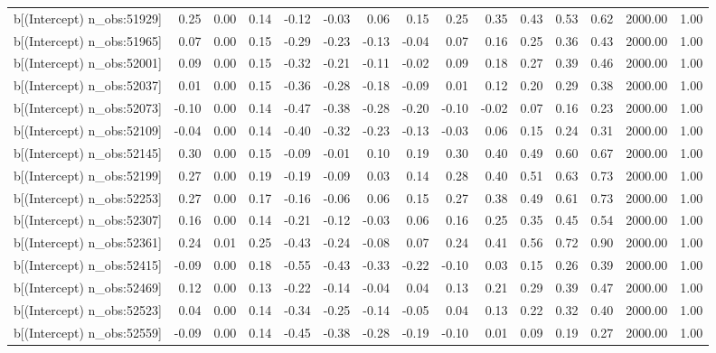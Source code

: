 \begin{table}[ht]
\begin{tabular}{rrrrrrrrrrrrrrr}
  b[(Intercept) n\_obs:51929] & 0.25 & 0.00 & 0.14 & -0.12 & -0.03 & 0.06 & 0.15 & 0.25 & 0.35 & 0.43 & 0.53 & 0.62 & 2000.00 & 1.00 \\ 
  b[(Intercept) n\_obs:51965] & 0.07 & 0.00 & 0.15 & -0.29 & -0.23 & -0.13 & -0.04 & 0.07 & 0.16 & 0.25 & 0.36 & 0.43 & 2000.00 & 1.00 \\ 
  b[(Intercept) n\_obs:52001] & 0.09 & 0.00 & 0.15 & -0.32 & -0.21 & -0.11 & -0.02 & 0.09 & 0.18 & 0.27 & 0.39 & 0.46 & 2000.00 & 1.00 \\ 
  b[(Intercept) n\_obs:52037] & 0.01 & 0.00 & 0.15 & -0.36 & -0.28 & -0.18 & -0.09 & 0.01 & 0.12 & 0.20 & 0.29 & 0.38 & 2000.00 & 1.00 \\ 
  b[(Intercept) n\_obs:52073] & -0.10 & 0.00 & 0.14 & -0.47 & -0.38 & -0.28 & -0.20 & -0.10 & -0.02 & 0.07 & 0.16 & 0.23 & 2000.00 & 1.00 \\ 
  b[(Intercept) n\_obs:52109] & -0.04 & 0.00 & 0.14 & -0.40 & -0.32 & -0.23 & -0.13 & -0.03 & 0.06 & 0.15 & 0.24 & 0.31 & 2000.00 & 1.00 \\ 
  b[(Intercept) n\_obs:52145] & 0.30 & 0.00 & 0.15 & -0.09 & -0.01 & 0.10 & 0.19 & 0.30 & 0.40 & 0.49 & 0.60 & 0.67 & 2000.00 & 1.00 \\ 
  b[(Intercept) n\_obs:52199] & 0.27 & 0.00 & 0.19 & -0.19 & -0.09 & 0.03 & 0.14 & 0.28 & 0.40 & 0.51 & 0.63 & 0.73 & 2000.00 & 1.00 \\ 
  b[(Intercept) n\_obs:52253] & 0.27 & 0.00 & 0.17 & -0.16 & -0.06 & 0.06 & 0.15 & 0.27 & 0.38 & 0.49 & 0.61 & 0.73 & 2000.00 & 1.00 \\ 
  b[(Intercept) n\_obs:52307] & 0.16 & 0.00 & 0.14 & -0.21 & -0.12 & -0.03 & 0.06 & 0.16 & 0.25 & 0.35 & 0.45 & 0.54 & 2000.00 & 1.00 \\ 
  b[(Intercept) n\_obs:52361] & 0.24 & 0.01 & 0.25 & -0.43 & -0.24 & -0.08 & 0.07 & 0.24 & 0.41 & 0.56 & 0.72 & 0.90 & 2000.00 & 1.00 \\ 
  b[(Intercept) n\_obs:52415] & -0.09 & 0.00 & 0.18 & -0.55 & -0.43 & -0.33 & -0.22 & -0.10 & 0.03 & 0.15 & 0.26 & 0.39 & 2000.00 & 1.00 \\ 
  b[(Intercept) n\_obs:52469] & 0.12 & 0.00 & 0.13 & -0.22 & -0.14 & -0.04 & 0.04 & 0.13 & 0.21 & 0.29 & 0.39 & 0.47 & 2000.00 & 1.00 \\ 
  b[(Intercept) n\_obs:52523] & 0.04 & 0.00 & 0.14 & -0.34 & -0.25 & -0.14 & -0.05 & 0.04 & 0.13 & 0.22 & 0.32 & 0.40 & 2000.00 & 1.00 \\ 
  b[(Intercept) n\_obs:52559] & -0.09 & 0.00 & 0.14 & -0.45 & -0.38 & -0.28 & -0.19 & -0.10 & 0.01 & 0.09 & 0.19 & 0.27 & 2000.00 & 1.00 \\ 

\end{tabular}
\end{table}
